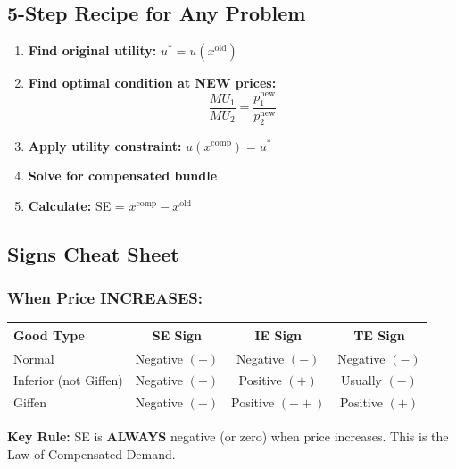 \documentclass[11pt]{article}
\begin{document}
\subsection{5-Step Recipe for Any Problem}

\begin{enumerate}[leftmargin=2cm, itemsep=1.5em]
    \item \textbf{Find original utility:} $u^* = u(x^{\text{old}})$

    \item \textbf{Find optimal condition at NEW prices:}
    \[\frac{MU_1}{MU_2} = \frac{p_1^{\text{new}}}{p_2^{\text{new}}}\]

    \item \textbf{Apply utility constraint:} $u(x^{\text{comp}}) = u^*$

    \item \textbf{Solve for compensated bundle}

    \item \textbf{Calculate:} SE = $x^{\text{comp}} - x^{\text{old}}$
\end{enumerate}

\subsection{Signs Cheat Sheet}

\subsubsection{When Price INCREASES:}

\begin{center}
\begin{tabular}{|l|c|c|c|}
\hline
\textbf{Good Type} & \textbf{SE Sign} & \textbf{IE Sign} & \textbf{TE Sign} \\
\hline
Normal & Negative $(-)$ & Negative $(-)$ & Negative $(-)$ \\
\hline
Inferior (not Giffen) & Negative $(-)$ & Positive $(+)$ & Usually $(-)$ \\
\hline
Giffen & Negative $(-)$ & Positive $(++)$ & Positive $(+)$ \\
\hline
\end{tabular}
\end{center}

\vspace{1em}

\textbf{Key Rule:} SE is \textbf{ALWAYS} negative (or zero) when price increases. This is the Law of Compensated Demand.
\end{document}
